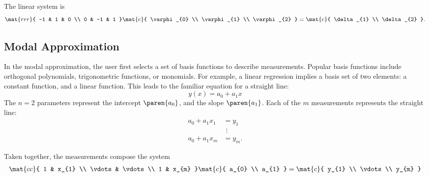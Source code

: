 The linear system is
  \begin{equation}   %
    \mat{rrr}{ 
      -1 & 1 & 0 \\
       0 & -1 & 1 }
    \mat{c}{ \varphi_{0} \\ \varphi_{1} \\ \varphi_{2} }
    =
    \mat{c}{ \delta_{1} \\ \delta_{2} } .
    \label{eq:zonalls}
  \end{equation}

\subsection{\label{ssec:modal approx}Modal Approximation}  %
In the modal approximation, the user first selects a set of basis functions to describe measurements. Popular basis functions include orthogonal polynomials, trigonometric functions, or monomials. For example, a linear regression implies a basis set of two elements: a constant function, and a linear function. This leads to the familiar equation for a straight line:
  \begin{equation*}   %
    y(x) = a_{0} + a_{1} x
  \end{equation*}
The $n=2$ parameters represent the intercept $\paren{a_{0}}$, and the slope $\paren{a_{1}}$. Each of the $m$ measurements represents the straight line:
  \begin{equation*}   %
   \begin{split}
     a_{0} + a_{1} x_{1} &= y_{1} \\
       & \ \, \vdots \\
     a_{0} + a_{1} x_{m} &= y_{m} .
   \end{split}
  \end{equation*}

Taken together, the measurements compose the system
  \begin{equation}   %
   \begin{split}
     \mat{cc}{ 1 & x_{1} \\ \vdots & \vdots \\ 1 & x_{m} }
     \mat{c}{ a_{0} \\ a_{1} }
     =
     \mat{c}{ y_{1} \\ \vdots \\ y_{m} }
    \label{eq:modalls}
   \end{split}
  \end{equation}

